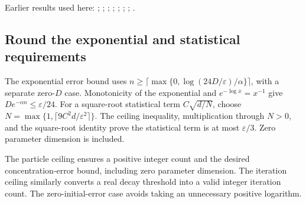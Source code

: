 \documentclass[11pt,a4paper]{report}
\begin{document}
Earlier results used here: \cite[Section~3.17.4]{LangevinLean2026ULASC}; \cite[Section~3.1.1]{LangevinLean2026IPLA}; \cite[Section~3.1.6]{LangevinLean2026IPLA}; \cite[Section~3.3.1]{LangevinLean2026IPLA}; \cite[Section~3.3.2]{LangevinLean2026IPLA}; \cite[Section~3.98.2]{LangevinLean2026Kinetic}; \cite[Section~3.98.4]{LangevinLean2026Kinetic}; \cite[Section~3.99.1]{LangevinLean2026Kinetic}.
\subsection{\texorpdfstring{Round the exponential and statistical requirements}{Round the exponential and statistical requirements}}
\label{report-step-KIPLMC-Accuracy-lean-2}


The exponential error bound uses \(n\ge\lceil\max\{0,\log(24D/\varepsilon)/\alpha\}\rceil\), with a separate zero-\(D\) case. Monotonicity of the exponential and \(e^{-\log x}=x^{-1}\) give \(De^{-\alpha n}\le\varepsilon/24\). For a square-root statistical term \(C\sqrt{d/N}\), choose \(N=\max\{1,\lceil9C^2d/\varepsilon^2\rceil\}\). The ceiling inequality, multiplication through \(N>0\), and the square-root identity prove the statistical term is at most \(\varepsilon/3\). Zero parameter dimension is included.



The particle ceiling ensures a positive integer count and the desired concentration-error bound, including zero parameter dimension. The iteration ceiling similarly converts a real decay threshold into a valid integer iteration count. The zero-initial-error case avoids taking an unnecessary positive logarithm.
\end{document}
